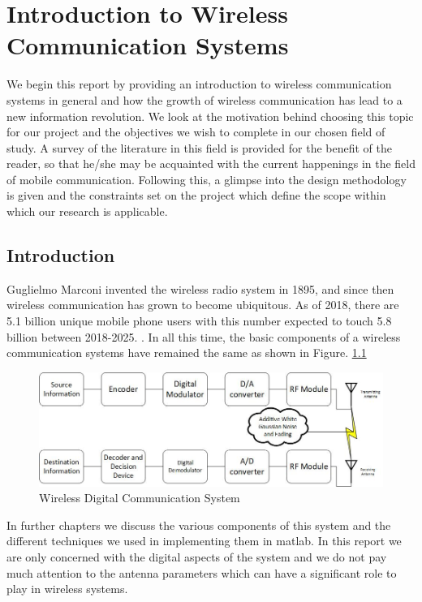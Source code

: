 \chapter{Introduction to Wireless Communication Systems}
We begin this report by providing an introduction to wireless communication systems in general and how the growth of wireless communication has lead to a new information revolution. We look at the motivation behind choosing this topic for our project and the objectives we wish to complete in our chosen field of study. A survey of the literature in this field is provided for the benefit of the reader, so that he/she may be acquainted with the current happenings in the field of mobile communication. Following this, a glimpse into the design methodology is given and the constraints set on the project which define the scope within which our research is applicable.    

\section[Introduction]{\textbf{Introduction}}
Guglielmo Marconi invented the wireless radio system in 1895, and since then wireless communication has grown to become ubiquitous. As of 2018, there are 5.1 billion unique mobile phone users with this number expected to touch 5.8 billion between 2018-2025. \parencite{George2017}.
In all this time, the basic components of a wireless communication systems have remained the same as shown in Figure. 
\ref{fig:wireless block diagram}
\begin{figure}[htb]
\centering
\includegraphics[scale=0.8]{Chapter 1/Figures/Wireless Communication System Block Diagram}
\caption{Wireless Digital Communication System}
\label{fig:wireless block diagram}
\end{figure}
 
In further chapters we discuss the various components of this system and the different techniques we used in implementing them in \gls{matlab}. In this report we are only concerned with the digital aspects of the system and we do not pay much attention to the antenna parameters which can have a significant role to play in wireless systems. 


